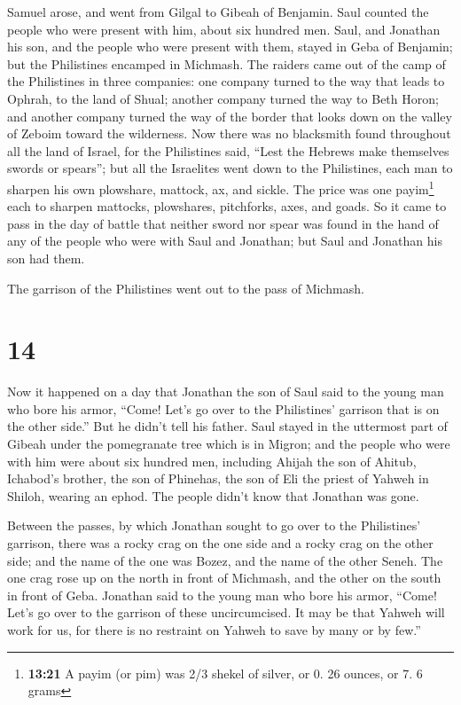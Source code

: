 Samuel arose, and went from Gilgal to Gibeah of
Benjamin. Saul counted the people who were present with him, about six
hundred men.  Saul, and Jonathan his son, and the people
who were present with them, stayed in Geba of Benjamin; but the
Philistines encamped in Michmash.  The raiders came out
of the camp of the Philistines in three companies: one company turned to
the way that leads to Ophrah, to the land of Shual; 
another company turned the way to Beth Horon; and another company turned
the way of the border that looks down on the valley of Zeboim toward the
wilderness.  Now there was no blacksmith found throughout
all the land of Israel, for the Philistines said, ``Lest the Hebrews
make themselves swords or spears'';  but all the
Israelites went down to the Philistines, each man to sharpen his own
plowshare, mattock, ax, and sickle.  The price was one
payim\footnote{\textbf{13:21} A payim (or pim) was 2/3 shekel of silver,
  or 0. 26 ounces, or 7. 6 grams} each to sharpen mattocks, plowshares,
pitchforks, axes, and goads.  So it came to pass in the
day of battle that neither sword nor spear was found in the hand of any
of the people who were with Saul and Jonathan; but Saul and Jonathan his
son had them.

 The garrison of the Philistines went out to the pass of
Michmash.

\hypertarget{section-13}{%
\section{14}\label{section-13}}

 Now it happened on a day that Jonathan the son of Saul
said to the young man who bore his armor, ``Come! Let's go over to the
Philistines' garrison that is on the other side.'' But he didn't tell
his father.  Saul stayed in the uttermost part of Gibeah
under the pomegranate tree which is in Migron; and the people who were
with him were about six hundred men,  including Ahijah the
son of Ahitub, Ichabod's brother, the son of Phinehas, the son of Eli
the priest of Yahweh in Shiloh, wearing an ephod. The people didn't know
that Jonathan was gone.

 Between the passes, by which Jonathan sought to go over
to the Philistines' garrison, there was a rocky crag on the one side and
a rocky crag on the other side; and the name of the one was Bozez, and
the name of the other Seneh.  The one crag rose up on the
north in front of Michmash, and the other on the south in front of Geba.
 Jonathan said to the young man who bore his armor,
``Come! Let's go over to the garrison of these uncircumcised. It may be
that Yahweh will work for us, for there is no restraint on Yahweh to
save by many or by few.''

